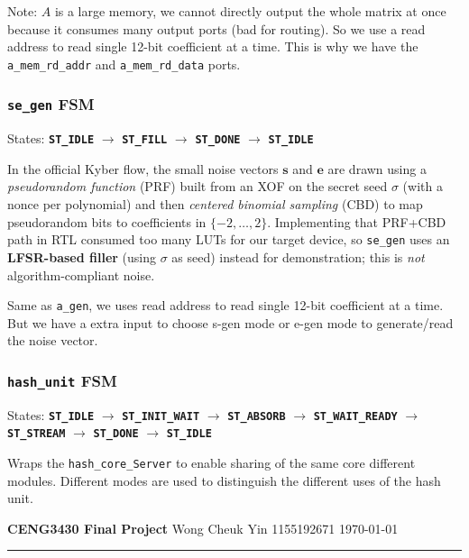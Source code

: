 \documentclass[11pt,a4paper]{article}
\begin{document}
\medskip
\noindent Note: $A$ is a large memory, we cannot directly output the whole matrix at once because it consumes many output ports (bad for routing). So we use a read address to read single 12-bit coefficient at a time. This is why we have the \texttt{a\_mem\_rd\_addr} and \texttt{a\_mem\_rd\_data} ports.

\medskip
\subsubsection{\texttt{se\_gen} FSM}                          
States: \textbf{\texttt{ST\_IDLE}} $\rightarrow$ \textbf{\texttt{ST\_FILL}} $\rightarrow$ \textbf{\texttt{ST\_DONE}} $\rightarrow$ \textbf{\texttt{ST\_IDLE}}

\medskip
\noindent In the official Kyber flow, the small noise vectors $\mathbf{s}$ and $\mathbf{e}$ are drawn using a \emph{pseudorandom function} (PRF) built from an XOF on the secret seed $\sigma$ (with a nonce per polynomial) and then \emph{centered binomial sampling} (CBD) to map pseudorandom bits to coefficients in $\{-2,\ldots,2\}$.
Implementing that PRF+CBD path in RTL consumed too many LUTs for our target device, so \texttt{se\_gen} uses an \textbf{LFSR-based filler} (using $\sigma$ as seed) instead for demonstration; this is \emph{not} algorithm-compliant noise. 

\medskip
\noindent Same as \texttt{a\_gen}, we uses read address to read single 12-bit coefficient at a time. But we have a extra input to choose s-gen mode or e-gen mode to generate/read the noise vector.

\subsubsection{\texttt{hash\_unit} FSM}
States: \textbf{\texttt{ST\_IDLE}} $\rightarrow$ \textbf{\texttt{ST\_INIT\_WAIT}} $\rightarrow$ \textbf{\texttt{ST\_ABSORB}} $\rightarrow$ \textbf{\texttt{ST\_WAIT\_READY}} $\rightarrow$ \textbf{\texttt{ST\_STREAM}} $\rightarrow$ \textbf{\texttt{ST\_DONE}} $\rightarrow$ \textbf{\texttt{ST\_IDLE}}

\medskip
\noindent Wraps the \texttt{hash\_core\_Server} to enable sharing of the same core different modules. Different modes are used to distinguish the different uses of the hash unit.

\newpage
{\noindent\large\textbf{CENG3430 Final Project} \hfill Wong Cheuk Yin 1155192671 \hfill \today}
\vspace{0.5em}
\hrule
\vspace{0.5em}
\end{document}
